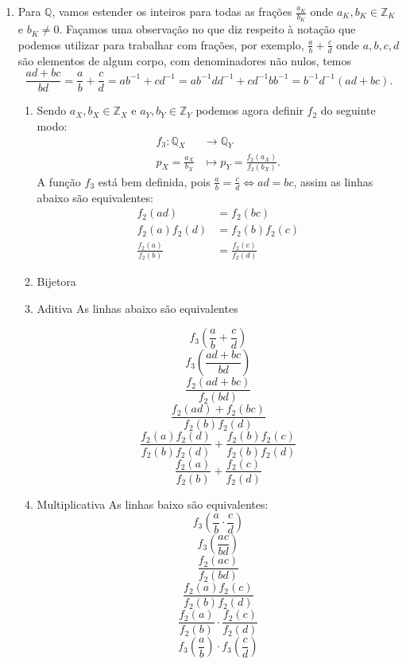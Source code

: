 \documentclass[../main.tex]{subfiles}
\begin{document}
\begin{dem}
\begin{enumerate}
    \item Para $\mathbb{Q}$, vamos estender os inteiros para todas as frações $\frac{a_K}{b_K}$ onde $a_K, b_K \in \mathbb{Z}_K$ e $b_K \neq 0$. 
        Façamos uma observação no que diz respeito à notação que podemos utilizar para trabalhar com frações, por exemplo, $\frac{a}{b} + \frac{c}{d}$ onde $a,b,c,d$ são elementos de algum corpo, com denominadores não nulos, temos 
        \[ \frac{ad+bc}{bd} = \frac{a}{b} + \frac{c}{d} = ab^{-1} + cd^{-1} = ab^{-1}dd^{-1} + cd^{-1}bb^{-1} = b^{-1}d^{-1}(ad+bc). \]
        \begin{enumerate}
            \item  Sendo $a_X, b_X \in \mathbb{Z}_X$ e $a_Y, b_Y \in \mathbb{Z}_Y$ podemos agora definir $f_2$ do seguinte modo:
                \begin{align*}
                    f_3 \colon \mathbb{Q}_X &\to \mathbb{Q}_Y \\
                    p_X = \frac{a_X}{b_X} &\mapsto p_Y = \frac{f_2(a_X)}{f_2(b_X)}.
                \end{align*}
                A função $f_3$ está bem definida, pois $\frac{a}{b} = \frac{c}{d} \iff ad = bc$, assim as linhas abaixo são equivalentes:
                \begin{align*}
                    f_2(ad) &= f_2(bc) \\
                    f_2(a)f_2(d) &= f_2(b)f_2(c) \\
                    \frac{f_2(a)}{f_2(b)} &= \frac{f_2(c)}{f_2(d)}
                \end{align*}


            \item Bijetora
            \item Aditiva
                As linhas abaixo são equivalentes
                
                    
                    \[ f_3 \left( \dfrac{a}{b} + \dfrac{c}{d} \right) \]
                    \[ f_3 \left(\dfrac{ad+bc}{bd} \right)   \]
                    \[ \dfrac{f_2(ad+bc)}{f_2(bd)}  \]
                    \[ \dfrac{f_2(ad)+f_2(bc)}{f_2(b)f_2(d)}  \]
                    \[ \dfrac{f_2(a)f_2(d)}{f_2(b)f_2(d)} + \dfrac{f_2(b)f_2(c)}{f_2(b)f_2(d)}  \]
                    \[ \dfrac{f_2(a)}{f_2(b)} + \dfrac{f_2(c)}{f_2(d)}  \]
                    
                    
                
            \item Multiplicativa
                As linhas baixo são equivalentes:
                \[ f_3 \left( \dfrac{a}{b} \cdot \dfrac{c}{d} \right) \]
                \[ f_3 \left( \dfrac{ac}{bd}  \right) \]
                \[ \dfrac{f_2(ac)}{f_2(bd)} \]
                \[ \dfrac{f_2(a)f_2(c)}{f_2(b)f_2(d)} \]
                \[ \dfrac{f_2(a)}{f_2(b)} \cdot \dfrac{f_2(c)}{f_2(d)} \]
                \[ f_3\left( \dfrac{a}{b} \right) \cdot f_3\left( \dfrac{c}{d} \right) \]
                

\end{enumerate}
\end{enumerate}
\end{dem}
\end{document}
